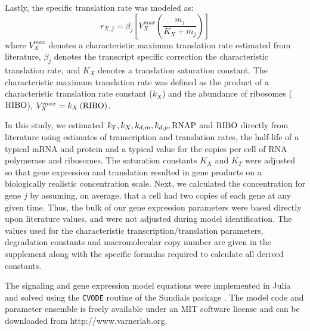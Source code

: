 \documentclass[11pt,letterpaper]{article}
\begin{document}
Lastly, the specific translation rate was modeled as:
\begin{equation}
	r_{X,j} = \beta_{j}\left[V^{max}_{X}\left(\frac{m_{j}}{K_{X}+m_{j}}\right)\right]
\end{equation}where $V^{max}_{X}$ denotes a characteristic maximum translation rate estimated from literature, $\beta_{j}$ denotes the transcript specific correction the characteristic translation rate,
and $K_{X}$ denotes a translation saturation constant.
The characteristic maximum translation rate was defined as the product of a characteristic translation rate constant ($k_{X}$)
and the abundance of ribosomes ($\rm RIBO$), $V^{max}_{X} = k_{X}\left(\rm RIBO\right)$.

In this study, we estimated $k_{T}, k_{X}, k_{d,m}, k_{d,p}, \rm RNAP$ and $\rm RIBO$ directly from literature using estimates of transcription and translation rates,
the half-life of a typical mRNA and protein and a typical value for the copies per cell of RNA polymerase and ribosomes.
The saturation constants $K_{X}$ and $K_{T}$ were adjusted so that gene expression and translation resulted in gene products on a biologically realistic concentration scale.
Next, we calculated the concentration for gene $j$ by assuming, on average,
that a cell had two copies of each gene at any given time. Thus, the bulk of our gene expression parameters were based directly upon literature values, and were not adjusted during model identification. The values used for the characteristic transcription/translation parameters, degradation constants and macromolecular copy number are given in the supplement along with the specific formulas required to calculate all derived constants.

The signaling and gene expression model equations were implemented in Julia and solved using the \texttt{CVODE} routine of the Sundials package \cite{Julia,Hindmarsh2005}.
The model code and parameter ensemble is freely available under an MIT software license and can be downloaded from http://www.varnerlab.org.
\end{document}
